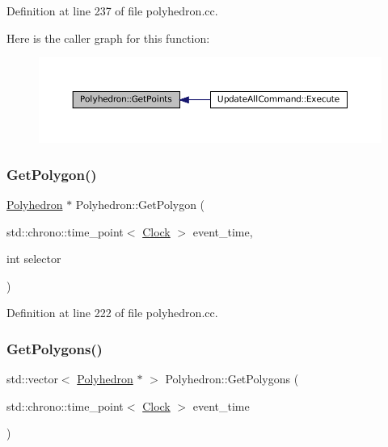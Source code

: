 Definition at line 237 of file polyhedron.\+cc.

Here is the caller graph for this function\+:\nopagebreak
\begin{figure}[H]
\begin{center}
\leavevmode
\includegraphics[width=350pt]{class_polyhedron_a1430429d6c8447e90b8c94ca46496a59_icgraph}
\end{center}
\end{figure}
\mbox{\label{class_polyhedron_a8b197b9eb163bdc83d9669d592bacac1}} 
\subsubsection{\texorpdfstring{Get\+Polygon()}{GetPolygon()}}
{\footnotesize\ttfamily \mbox{\hyperlink{class_polyhedron}{Polyhedron}} $\ast$ Polyhedron\+::\+Get\+Polygon (\begin{DoxyParamCaption}\item[{std\+::chrono\+::time\+\_\+point$<$ \mbox{\hyperlink{universe_8h_a0ef8d951d1ca5ab3cfaf7ab4c7a6fd80}{Clock}} $>$}]{event\+\_\+time,  }\item[{int}]{selector }\end{DoxyParamCaption})}



Definition at line 222 of file polyhedron.\+cc.

\mbox{\label{class_polyhedron_adeaf461cc8504a225f6344b954c196a8}} 
\subsubsection{\texorpdfstring{Get\+Polygons()}{GetPolygons()}}
{\footnotesize\ttfamily std\+::vector$<$ \mbox{\hyperlink{class_polyhedron}{Polyhedron}} $\ast$ $>$ Polyhedron\+::\+Get\+Polygons (\begin{DoxyParamCaption}\item[{std\+::chrono\+::time\+\_\+point$<$ \mbox{\hyperlink{universe_8h_a0ef8d951d1ca5ab3cfaf7ab4c7a6fd80}{Clock}} $>$}]{event\+\_\+time }\end{DoxyParamCaption})}



